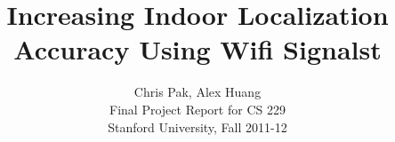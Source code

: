 \documentclass[11pt,twocolumn]{article}
\title{Increasing Indoor Localization Accuracy Using Wifi Signalst}
\author{Chris Pak, Alex Huang\\ 
Final Project Report for CS 229\\
Stanford University, Fall 2011-12}
\begin{document}
\maketitle








\nocite{*}


\end{document}

